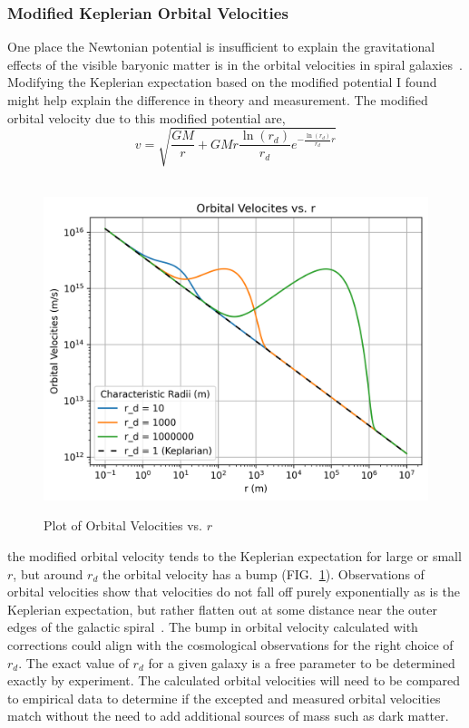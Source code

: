 \documentclass[aps,prd,preprint]{revtex4-1}
\begin{document}
\subsubsection*{Modified Keplerian Orbital Velocities}
One place the Newtonian potential is insufficient to explain the gravitational effects of the visible baryonic matter is in the orbital velocities in spiral galaxies~\cite{burstein_1985,freeman_1970}. Modifying the Keplerian expectation based on the modified potential I found might help explain the difference in theory and measurement. The modified orbital velocity due to this modified potential are,
\begin{equation}
    v = \sqrt{\frac{GM}{r} + GMr \frac{\ln(r_d)}{r_d} e^{-\frac{\ln(r_d)}{r_d} r}}
\end{equation}
\begin{figure}[H]\
    \centering
    \includegraphics[scale=0.75]{figures/graph_orbvelVr.png}
    \caption{Plot of Orbital Velocities vs. $r$}
    \label{fig:graph_orbvelVr}
\end{figure}
the modified orbital velocity tends to the Keplerian expectation for large or small $r$, but around $r_d$ the orbital velocity has a bump (FIG.~\ref{fig:graph_orbvelVr}). Observations of orbital velocities show that velocities do not fall off purely exponentially as is the Keplerian expectation, but rather flatten out at some distance near the outer edges of the galactic spiral~\cite{navarro_1997,brownstein_2006}. The bump in orbital velocity calculated with corrections could align with the cosmological observations for the right choice of $r_d$. The exact value of $r_d$ for a given galaxy is a free parameter to be determined exactly by experiment. The calculated orbital velocities will need to be compared to empirical data to determine if the excepted and measured orbital velocities match without the need to add additional sources of mass such as dark matter.
\end{document}
